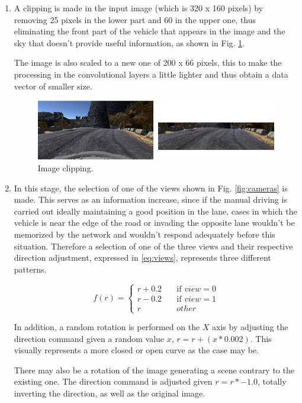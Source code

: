 \documentclass[conference]{IEEEtran}
\begin{document}
\begin{enumerate}
	\item A clipping is made in the input image (which is 320 x 160 pixels) by removing 25 pixels in the lower part and 60 in the upper one, thus eliminating the front part of the vehicle that appears in the image and the sky that doesn't provide useful information, as shown in Fig. \ref{fig:cutted}. 
	
	The image is also scaled to a new one of 200 x 66 pixels, this to make the processing in the convolutional layers a little lighter and thus obtain a data vector of smaller size.
	
	\begin{figure}[H]
		\centerline{\includegraphics[scale=0.36]{img/cutted}}
		\caption{Image clipping.}
		\label{fig:cutted}
	\end{figure}
	
	\item In this stage, the selection of one of the views shown in Fig. \ref{fig:cameras} is made. This serves as an information increase, since if the manual driving is carried out ideally maintaining a good position in the lane, cases in which the vehicle is near the edge of the road or invading the opposite lane wouldn't be memorized by the network and wouldn't respond adequately before this situation. Therefore a selection of one of the three views and their respective direction adjustment, expressed in \eqref{eq:views}, represents three different patterns.
	
	\begin{equation}
		f(r) =
		\begin{cases}
		r+0.2       & \quad \text{if } view = 0\\
		r-0.2  & \quad \text{if } view = 1\\
		r & \quad other
		\end{cases}
		\label{eq:views}
	\end{equation}
	
	In addition, a random rotation is performed on the $X$ axis by adjusting the direction command given a random value $x$, $r = r + (x * 0.002)$. This visually represents a more closed or open curve as the case may be.
	
	There may also be a rotation of the image generating a scene contrary to the existing one. The direction command is adjusted given $r = r * -1.0$, totally inverting the direction, as well as the original image.
\end{enumerate}
\end{document}
